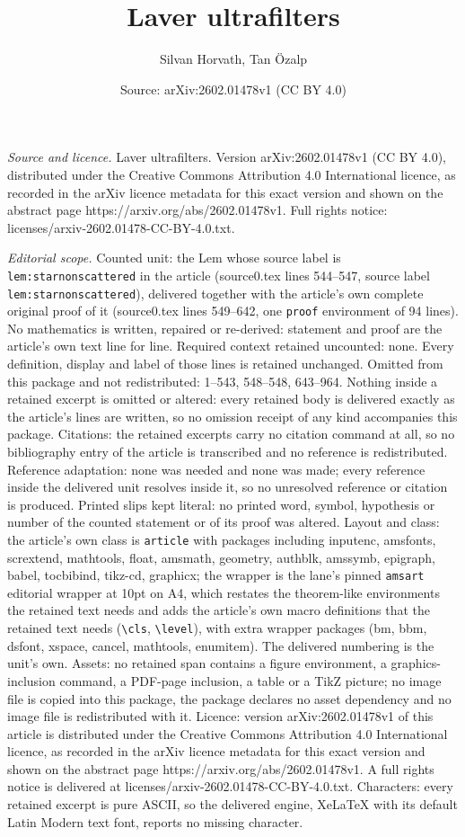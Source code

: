 \documentclass[10pt,a4paper]{amsart}
\title[Laver ultrafilters]{Laver ultrafilters}
\author{Silvan Horvath, Tan \"Ozalp}
\date{Source: arXiv:2602.01478v1 (CC BY 4.0)}
\begin{document}
\maketitle

\noindent\emph{Source and licence.} Laver ultrafilters. Version arXiv:2602.01478v1 (CC BY 4.0), distributed under the Creative Commons Attribution 4.0 International licence, as recorded in the arXiv licence metadata for this exact version and shown on the abstract page https://arxiv.org/abs/2602.01478v1. Full rights notice: licenses/arxiv-2602.01478-CC-BY-4.0.txt.\par\smallskip

\noindent\textit{Editorial scope.} Counted unit: the Lem whose source label is \texttt{lem:starnonscattered} in the article (source0.tex lines 544--547, source label \texttt{lem:starnonscattered}), delivered together with the article's own complete original proof of it (source0.tex lines 549--642, one \texttt{proof} environment of 94 lines). No mathematics is written, repaired or re-derived: statement and proof are the article's own text line for line. Required context retained uncounted: none. Every definition, display and label of those lines is retained unchanged. Omitted from this package and not redistributed: 1--543, 548--548, 643--964. Nothing inside a retained excerpt is omitted or altered: every retained body is delivered exactly as the article's lines are written, so no omission receipt of any kind accompanies this package. Citations: the retained excerpts carry no citation command at all, so no bibliography entry of the article is transcribed and no reference is redistributed. Reference adaptation: none was needed and none was made; every reference inside the delivered unit resolves inside it, so no unresolved reference or citation is produced. Printed slips kept literal: no printed word, symbol, hypothesis or number of the counted statement or of its proof was altered. Layout and class: the article's own class is \texttt{article} with packages including inputenc, amsfonts, scrextend, mathtools, float, amsmath, geometry, authblk, amssymb, epigraph, babel, tocbibind, tikz-cd, graphicx; the wrapper is the lane's pinned \texttt{amsart} editorial wrapper at 10pt on A4, which restates the theorem-like environments the retained text needs and adds the article's own macro definitions that the retained text needs (\texttt{\textbackslash cls}, \texttt{\textbackslash level}), with extra wrapper packages (bm, bbm, dsfont, xspace, cancel, mathtools, enumitem). The delivered numbering is the unit's own. Assets: no retained span contains a figure environment, a graphics-inclusion command, a PDF-page inclusion, a table or a TikZ picture; no image file is copied into this package, the package declares no asset dependency and no image file is redistributed with it. Licence: version arXiv:2602.01478v1 of this article is distributed under the Creative Commons Attribution 4.0 International licence, as recorded in the arXiv licence metadata for this exact version and shown on the abstract page https://arxiv.org/abs/2602.01478v1. A full rights notice is delivered at licenses/arxiv-2602.01478-CC-BY-4.0.txt. Characters: every retained excerpt is pure ASCII, so the delivered engine, XeLaTeX with its default Latin Modern text font, reports no missing character.
\end{document}

